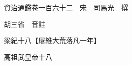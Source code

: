 










 


 
 


 

  
  
  
  
  





  
  
  
  
  
 
  

  

  
  
  



  

 
 

  
   




  

  
  


  　　資治通鑑卷一百六十二　宋　司馬光　撰

　　胡三省　音註

　　梁紀十八【屠維大荒落凡一年】

　　高祖武皇帝十八

